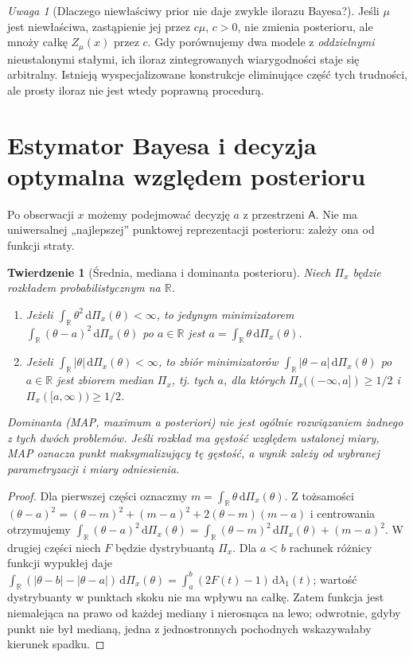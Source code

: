 \documentclass[11pt,a4paper,oneside]{report}
\numberwithin{equation}{chapter}
\theoremstyle{plain}
\newtheorem{twierdzenie}{Twierdzenie}[chapter]
\theoremstyle{definition}
\theoremstyle{remark}
\newtheorem{uwaga}{Uwaga}[chapter]
\newcommand{\R}{\mathbb R}
\newcommand{\dd}{\mathrm d}
\begin{document}
\begin{uwaga}[Dlaczego niewłaściwy prior nie daje zwykle ilorazu Bayesa?]
Jeśli $\mu$ jest niewłaściwa, zastąpienie jej przez $c\mu$, $c>0$,
nie zmienia posterioru, ale mnoży całkę $Z_\mu(x)$ przez $c$.
Gdy porównujemy dwa modele z \emph{oddzielnymi} nieustalonymi
stałymi, ich iloraz zintegrowanych wiarygodności staje się
arbitralny. Istnieją wyspecjalizowane konstrukcje eliminujące część
tych trudności, ale prosty iloraz nie jest wtedy poprawną procedurą.
\end{uwaga}

\section{Estymator Bayesa i decyzja optymalna względem posterioru}
Po obserwacji $x$ możemy podejmować decyzję $a$ z przestrzeni
$\mathsf A$. Nie ma uniwersalnej „najlepszej” punktowej reprezentacji
posterioru: zależy ona od funkcji straty.

\begin{twierdzenie}[Średnia, mediana i dominanta posterioru]
\label{thm:bayes-actions}
Niech $\Pi_x$ będzie rozkładem probabilistycznym na $\R$.
\begin{enumerate}
\item Jeżeli $\int_\R\theta^2\,\dd\Pi_x(\theta)<\infty$, to
jedynym minimizatorem $\int_\R(\theta-a)^2\,\dd\Pi_x(\theta)$
po $a\in\R$ jest $a=\int_\R\theta\,\dd\Pi_x(\theta)$.
\item Jeżeli $\int_\R|\theta|\,\dd\Pi_x(\theta)<\infty$,
to zbiór minimizatorów $\int_\R|\theta-a|\,\dd\Pi_x(\theta)$
po $a\in\R$ jest zbiorem median $\Pi_x$, tj. tych $a$, dla których
$\Pi_x(({-}\infty,a])\ge1/2$ i $\Pi_x([a,\infty))\ge1/2$.
\end{enumerate}
Dominanta (MAP, \emph{maximum a posteriori}) nie jest ogólnie
rozwiązaniem żadnego z tych dwóch problemów. Jeśli rozkład ma gęstość
względem ustalonej miary, MAP oznacza punkt maksymalizujący tę gęstość,
a wynik zależy od wybranej parametryzacji i miary odniesienia.
\end{twierdzenie}
\begin{proof}
Dla pierwszej części oznaczmy $m=\int_\R\theta\,\dd\Pi_x(\theta)$.
Z tożsamości $(\theta-a)^2=(\theta-m)^2+(m-a)^2
+2(\theta-m)(m-a)$ i centrowania otrzymujemy
$\int_\R(\theta-a)^2\,\dd\Pi_x(\theta)
=\int_\R(\theta-m)^2\,\dd\Pi_x(\theta)+(m-a)^2$.
W drugiej części niech $F$ będzie dystrybuantą $\Pi_x$.
Dla $a<b$ rachunek różnicy funkcji wypukłej daje
$\int_\R (|\theta-b|-|\theta-a|)\,\dd\Pi_x(\theta)
=\int_a^b(2F(t)-1)\,\dd\lambda_1(t)$;
wartość dystrybuanty w punktach skoku nie ma wpływu na całkę.
Zatem funkcja jest niemalejąca na prawo od każdej mediany
i nierosnąca na lewo; odwrotnie, gdyby punkt nie był medianą,
jedna z jednostronnych pochodnych wskazywałaby kierunek spadku.
\end{proof}
\end{document}
